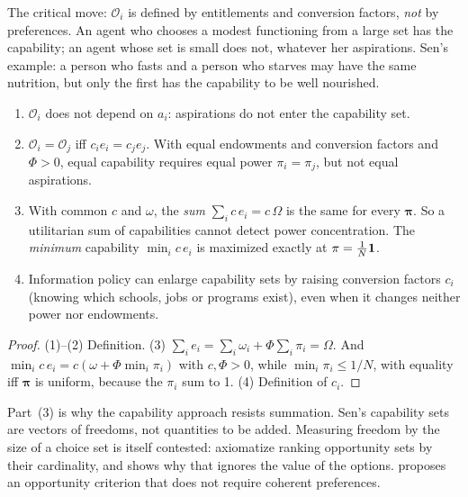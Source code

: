 \documentclass[../structural_economics_book.tex]{subfiles}
\begin{document}
The critical move: $\mathcal{O}_i$ is defined by entitlements and conversion factors, \textit{not} by preferences. An agent who chooses a modest functioning from a large set has the capability; an agent whose set is small does not, whatever her aspirations. Sen's example: a person who fasts and a person who starves may have the same nutrition, but only the first has the capability to be well nourished.

\begin{proposition}\label{ch12:prop:capability}
\begin{enumerate}
\item $\mathcal{O}_i$ does not depend on $a_i$: aspirations do not enter the capability set.
\item $\mathcal{O}_i = \mathcal{O}_j$ iff $c_i e_i = c_j e_j$. With equal endowments and conversion factors and $\Phi > 0$, equal capability requires equal power $\pi_i = \pi_j$, but not equal aspirations.
\item With common $c$ and $\omega$, the \textit{sum} $\sum_i c\,e_i = c\,\Omega$ is the same for every $\boldsymbol{\pi}$. So a utilitarian sum of capabilities cannot detect power concentration. The \textit{minimum} capability $\min_i c\,e_i$ is maximized exactly at $\pi = \frac{1}{N}\mathbf{1}$.
\item Information policy can enlarge capability sets by raising conversion factors $c_i$ (knowing which schools, jobs or programs exist), even when it changes neither power nor endowments.
\end{enumerate}
\end{proposition}

\begin{proof}
(1)--(2) Definition. (3) $\sum_i e_i = \sum_i\omega_i + \Phi\sum_i\pi_i = \Omega$. And $\min_i c\,e_i = c(\omega + \Phi\min_i\pi_i)$ with $c, \Phi > 0$, while $\min_i \pi_i \le 1/N$, with equality iff $\boldsymbol{\pi}$ is uniform, because the $\pi_i$ sum to 1. (4) Definition of $c_i$.
\end{proof}

Part~(3) is why the capability approach resists summation. Sen's capability sets are vectors of freedoms, not quantities to be added. Measuring freedom by the size of a choice set is itself contested: \citet{pattanaik1990ranking} axiomatize ranking opportunity sets by their cardinality, and \citet{sen1991welfare} shows why that ignores the value of the options. \citet[\textit{AER}]{sugden2004opportunity} proposes an opportunity criterion that does not require coherent preferences.
\end{document}
